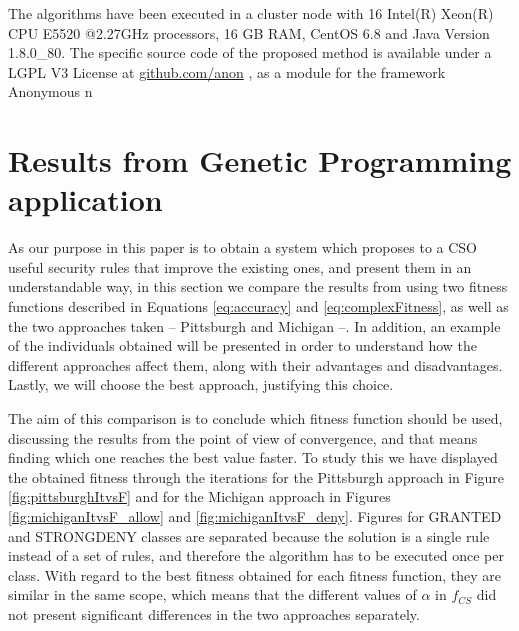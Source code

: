 \documentclass[runningheads]{llncs}
\begin{document}
The algorithms have been executed in a cluster node with 16 Intel(R) Xeon(R) CPU E5520
@2.27GHz processors, 16 GB RAM, CentOS 6.8 and Java Version
1.8.0\_80. The specific source code of the proposed method is available under a LGPL V3 License 
at \url{github.com/anon}
, as a module for 
the framework Anonymous
n

\section{Results from Genetic Programming application} 
\label{sec:gp}

As our purpose in this paper is to obtain a system which proposes to a CSO useful security rules that improve the existing ones, and present them in an understandable way, in this section we compare the results from using two fitness functions
described in Equations \ref{eq:accuracy} and \ref{eq:complexFitness}, as well as the two approaches taken -- Pittsburgh and Michigan --. In addition, an example of the individuals obtained will be presented in order to understand how the different approaches affect them, along with
their advantages and disadvantages.
Lastly, we will choose the best
approach, justifying this choice. 


\label{subsec:fitnesscomparison}

The aim of this comparison is to conclude which fitness function should be used, discussing the results from the point of view of convergence, and that means finding which one reaches the best value faster. To study this we have displayed the obtained fitness through the iterations for the Pittsburgh approach in Figure \ref{fig:pittsburghItvsF} and for the Michigan approach in Figures \ref{fig:michiganItvsF_allow} and \ref{fig:michiganItvsF_deny}. Figures for GRANTED and STRONGDENY classes are separated because the solution is a single rule instead of a set of rules, and therefore the algorithm has to be executed once per class. With regard to the best fitness obtained for each fitness function, they are similar in the same scope, which means that the different values of $\alpha$ in $f_{CS}$ did not present significant differences in the two approaches separately.
\end{document}
